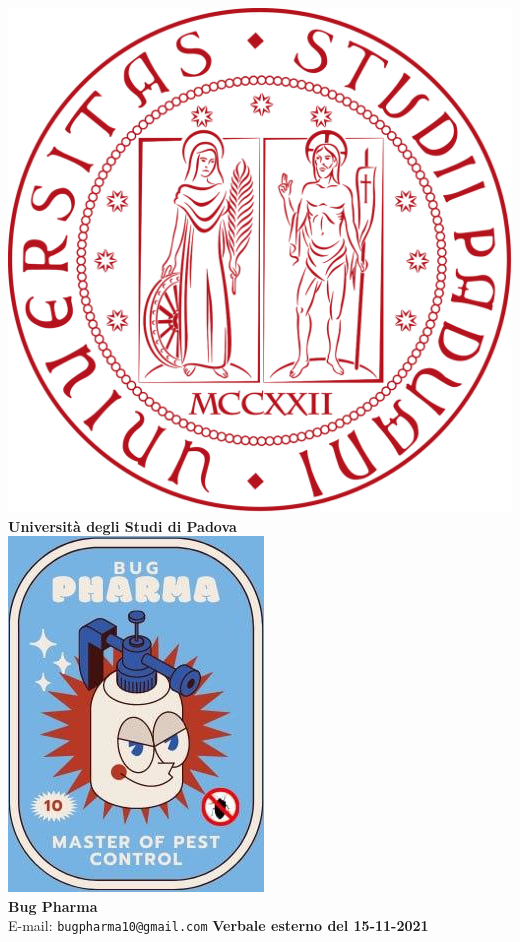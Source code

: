 \documentclass[11pt]{article}
\begin{document}
	\thispagestyle{empty}
	\begin{titlepage}
		\begin{center}
			\includegraphics[scale = 0.05]{../../logo_unipd.png}\\
			\large \textbf{Università degli Studi di Padova} \\
			\vfill
			\includegraphics[scale = 0.7]{../../logo_small.jpg}\\
			\large \textbf{Bug Pharma} \\
			\vfill
			\large
			E-mail: 
			\texttt{bugpharma10@gmail.com}
			\vfill
			\Huge \textbf{Verbale esterno del 15-11-2021}\\
			

\end{center}
\end{titlepage}
\end{document}
